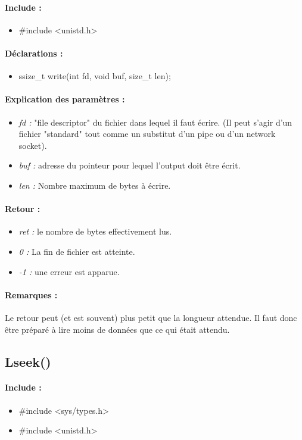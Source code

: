 \documentclass{article}[12pt]
\begin{document}
\paragraph{Include : }
\begin{itemize}
	\item \#include <unistd.h>
\end{itemize}
\paragraph{Déclarations : }
\begin{itemize}
	\item ssize\_t write(int fd, void \* buf, size\_t len);
\end{itemize}
\paragraph{Explication des paramètres : }
\begin{itemize}
	\item \emph{fd : } "file descriptor" du fichier dans lequel il faut écrire. (Il peut s'agir d'un fichier "standard" tout comme un substitut d'un pipe ou d'un network socket).
	\item \emph{buf : } adresse du pointeur pour lequel l'output doit être écrit.
	\item \emph{len : } Nombre maximum de bytes à écrire.
\end{itemize}
\paragraph{Retour : }
\begin{itemize}
	\item \emph{ret : } le nombre de bytes effectivement lus.
	\item \emph{0 : } La fin de fichier est atteinte.
	\item \emph{-1 : } une erreur est apparue.
\end{itemize}
\paragraph{Remarques : }
Le retour peut (et est souvent) plus petit que la longueur attendue. Il faut donc être préparé à lire moins de données que ce qui était attendu. 
\subsection{Lseek()}
\paragraph{Include : }
\begin{itemize}
	\item \#include <sys/types.h>
	\item \#include <unistd.h>
\end{itemize}
\end{document}
